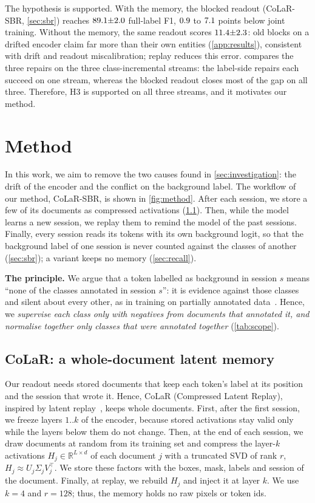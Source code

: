 \documentclass[10pt,twocolumn,letterpaper]{article}
\newcommand{\runin}[1]{\par\addvspace{0.7ex plus .3ex minus .1ex}\noindent\textbf{#1}\hspace{1em}\ignorespaces}
\begin{document}
The hypothesis is supported. With the memory, the blocked readout (CoLaR-SBR, \cref{sec:sbr}) reaches $89.1{\pm}2.0$ full-label F1, $0.9$ to $7.1$ points below joint training. Without the memory, the same readout scores $11.4{\pm}2.3$: old blocks on a drifted encoder claim far more than their own entities (\cref{app:results}), consistent with drift and readout miscalibration; replay reduces this error.  compares the three repairs on the three class-incremental streams: the label-side repairs each succeed on one stream, whereas the blocked readout closes most of the gap on all three. Therefore, H3 is supported on all three streams, and it motivates our method.

\section{Method}
\label{sec:design}
In this work, we aim to remove the two causes found in \cref{sec:investigation}: the drift of the encoder and the conflict on the background label. The workflow of our method, CoLaR-SBR, is shown in \cref{fig:method}. After each session, we store a few of its documents as compressed activations (\cref{sec:memory}). Then, while the model learns a new session, we replay them to remind the model of the past sessions. Finally, every session reads its tokens with its own background logit, so that the background label of one session is never counted against the classes of another (\cref{sec:sbr}); a variant keeps no memory (\cref{sec:recall}).



\runin{The principle.} We argue that a token labelled as background in session $s$ means ``none of the classes annotated in session $s$'': it is evidence against those classes and silent about every other, as in training on partially annotated data~\citep{greenberg2018marginal}. Hence, we \emph{supervise each class only with negatives from documents that annotated it, and normalise together only classes that were annotated together} (\cref{tab:scope}).

\subsection{CoLaR: a whole-document latent memory}
\label{sec:memory}
Our readout needs stored documents that keep each token's label at its position and the session that wrote it. Hence, CoLaR (Compressed Latent Replay), inspired by latent replay~\citep{hayes2020remind,pellegrini2020latent}, keeps whole documents. First, after the first session, we freeze layers $1..k$ of the encoder, because stored activations stay valid only while the layers below them do not change. Then, at the end of each session, we draw documents at random from its training set and compress the layer-$k$ activations $H_j\in\mathbb{R}^{L\times d}$ of each document $j$ with a truncated SVD of rank $r$, $H_j\approx U_j\Sigma_jV_j^{\top}$. We store these factors with the boxes, mask, labels and session of the document. Finally, at replay, we rebuild $H_j$ and inject it at layer $k$. We use $k{=}4$ and $r{=}128$; thus, the memory holds no raw pixels or token ids.
\end{document}
